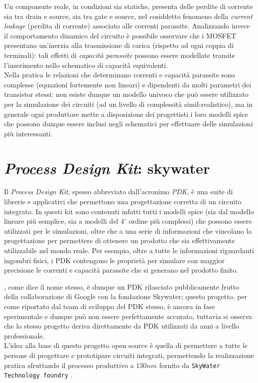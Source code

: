 	Un componente reale, in condizioni sia statiche, presenta delle perdite di corrente sia tra drain e source, sia tra gate e source, nel cosiddetto fenomeno della \textit{current leakage} (perdita di corrente) associato alle correnti parassite. Analizzando invece il comportamento dinamico del circuito è possibile osservare che i MOSFET presentano un'inerzia alla trasmissione di carica (rispetto ad ogni coppia di terminali): tali effetti di \textit{capacità parassite} possono essere modellate tramite l'inserimento nello schematico di capacità equivalenti. \\
	Nella pratica le relazioni che determinano correnti e capacità parassite sono complesse (equazioni fortemente non lineari) e dipendenti da molti parametri dei transistor stessi: non esiste dunque un modello univoco che può essere utilizzato per la simulazione dei circuiti (ad un livello di complessità simil-realistico), ma in generale ogni produttore mette a disposizione dei progettisti i loro modelli spice che possono dunque essere inclusi negli schematici per effettuare delle simulazioni più interessanti.
	
\section{\textit{Process Design Kit}: skywater}
	
	Il \textit{Process Design Kit}, spesso abbreviato dall'acronimo \textit{PDK}, è una suite di librerie e applicativi che permettono una progettazione corretta di un circuito integrato. In questi kit sono contenuti infatti tutti i modelli spice (sia dal modello lineare più semplice, sia a modelli del $4^\circ$ ordine più complessi) che possono essere utilizzati per le simulazioni, oltre che a una serie di informazioni che vincolano la progettazione per permettere di ottenere un prodotto che sia effettivamente utilizzabile nel mondo reale. Per esempio, oltre a tutte le informazioni riguardanti ingombri fisici, i PDK contengono le proprietà per simulare con maggior precisione le correnti e capacità parassite che si generano nel prodotto finito.
	
	\skywater, come dice il nome stesso, è dunque un PDK rilasciato pubblicamente frutto della collaborazione di Google con la fondazione Skywater; questo progetto, per come riportato dal team di sviluppo del PDK stesso, è ancora in fase sperimentale e dunque può non essere perfettamente accurato, tuttavia si osserva che lo stesso progetto deriva direttamente da PDK utilizzati da anni a livello professionale. \\
	L'idea alla base di questo progetto open source è quella di permettere a tutte le persone di progettare e prototipare circuiti integrati, permettendo la realizzazione pratica sfruttando il processo produttivo a $130 nm$ fornito da \texttt{SkyWater Technology foundry} \cite{fossi}.
	
